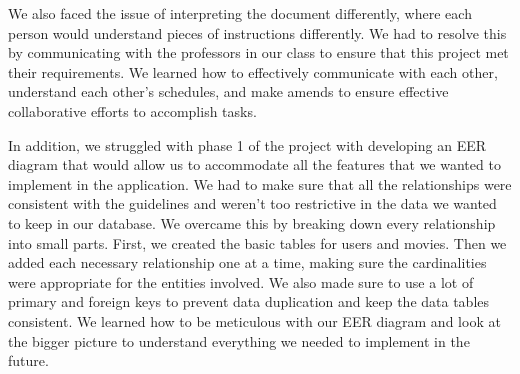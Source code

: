 \documentclass[12pt]{article}
\begin{document}
We also faced the issue of interpreting the document differently, where each person would understand pieces of instructions differently. We had to resolve this by communicating with the professors in our class to ensure that this project met their requirements. We learned how to effectively communicate with each other, understand each other's schedules, and make amends to ensure effective collaborative efforts to accomplish tasks.

In addition, we struggled with phase 1 of the project with developing an EER diagram that would allow us to accommodate all the features that we wanted to implement in the application. We had to make sure that all the relationships were consistent with the guidelines and weren't too restrictive in the data we wanted to keep in our database. We overcame this by breaking down every relationship into small parts. First, we created the basic tables for users and movies. Then we added each necessary relationship one at a time, making sure the cardinalities were appropriate for the entities involved. We also made sure to use a lot of primary and foreign keys to prevent data duplication and keep the data tables consistent. We learned how to be meticulous with our EER diagram and look at the bigger picture to understand everything we needed to implement in the future.





\end{document}
